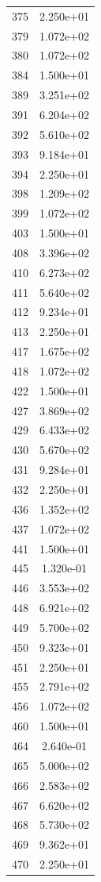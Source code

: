 \documentclass[12pt]{article}
\begin{document}
\begin{longtable}{@{}cc@{}}
375 & 2.250e+01 \\
379 & 1.072e+02 \\
380 & 1.072e+02 \\
384 & 1.500e+01 \\
389 & 3.251e+02 \\
391 & 6.204e+02 \\
392 & 5.610e+02 \\
393 & 9.184e+01 \\
394 & 2.250e+01 \\
398 & 1.209e+02 \\
399 & 1.072e+02 \\
403 & 1.500e+01 \\
408 & 3.396e+02 \\
410 & 6.273e+02 \\
411 & 5.640e+02 \\
412 & 9.234e+01 \\
413 & 2.250e+01 \\
417 & 1.675e+02 \\
418 & 1.072e+02 \\
422 & 1.500e+01 \\
427 & 3.869e+02 \\
429 & 6.433e+02 \\
430 & 5.670e+02 \\
431 & 9.284e+01 \\
432 & 2.250e+01 \\
436 & 1.352e+02 \\
437 & 1.072e+02 \\
441 & 1.500e+01 \\
445 & 1.320e-01 \\
446 & 3.553e+02 \\
448 & 6.921e+02 \\
449 & 5.700e+02 \\
450 & 9.323e+01 \\
451 & 2.250e+01 \\
455 & 2.791e+02 \\
456 & 1.072e+02 \\
460 & 1.500e+01 \\
464 & 2.640e-01 \\
465 & 5.000e+02 \\
466 & 2.583e+02 \\
467 & 6.620e+02 \\
468 & 5.730e+02 \\
469 & 9.362e+01 \\
470 & 2.250e+01 \\

\bottomrule
\end{longtable}
\end{document}
